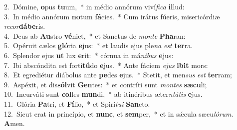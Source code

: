 {2.~}Dómine, \textbf{o}pus \textbf{tu}um,~* in médio annórum viví\textit{fi}\textit{ca} \textbf{il}lud:\\
{3.~}In médio annórum \textbf{no}tum \textbf{fá}cies.~* Cum irátus fúeris, misericórdiæ \textit{re}\textit{cor}\textbf{dá}\textbf{be}ris.\\
{4.~}Deus ab \textbf{Au}stro \textbf{vé}niet,~* et Sanctus de \textit{mon}\textit{te} \textbf{Pha}ran:\\
{5.~}Opéruit cælos \textbf{gló}ria \textbf{e}jus:~* et laudis ejus ple\textit{na} \textit{est} \textbf{ter}ra.\\
{6.~}Splendor ejus \textbf{ut} lux \textbf{e}rit:~* córnua in má\textit{ni}\textit{bus} \textbf{e}jus:\\
{7.~}Ibi abscóndita est forti\textbf{tú}do \textbf{e}jus.~* Ante fáciem \textit{e}\textit{jus} \textbf{i}\textbf{bit} mors:\\
{8.~}Et egrediétur diábolus ante \textbf{pe}des \textbf{e}jus.~* Stetit, et men\textit{sus} \textit{est} \textbf{ter}ram;\\
{9.~}Aspéxit, et dis\textbf{sól}vit \textbf{Gen}tes:~* et contríti sunt \textit{mon}\textit{tes} \textbf{sæ}\textbf{cu}li;\\
{10.~}Incurváti sunt \textbf{col}les \textbf{mun}di,~* ab itinéribus æter\textit{ntá}\textit{tis} \textbf{e}jus.\\
{11.~}Glória \textbf{Pa}tri, et \textbf{Fí}lio,~* et Spirí\textit{tu}\textit{i} \textbf{San}cto.\\
{12.~}Sicut erat in princípio, et \textbf{nunc}, et \textbf{sem}per,~* et in sǽcula sæcu\textit{ló}\textit{rum}. \textbf{A}men.\\
